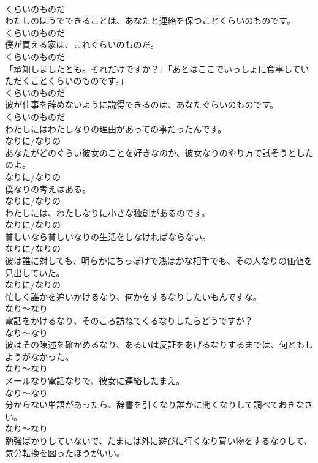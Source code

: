 \documentclass[8pt]{extreport}
\begin{document}
\begin{CJK}{UTF8}{min}
\\	くらいのものだ
\\	わたしのほうでできることは、あなたと連絡を保つことくらいのものです。	
\\	くらいのものだ
\\	僕が買える家は、これぐらいのものだ。	
\\	くらいのものだ
\\	「承知しましたとも。それだけですか？」「あとはここでいっしょに食事していただくことくらいのものです。」	
\\	くらいのものだ
\\	彼が仕事を辞めないように説得できるのは、あなたぐらいのものです。	
\\	くらいのものだ
\\	わたしにはわたしなりの理由があっての事だったんです。	
\\	なりに/なりの
\\	あなたがどのぐらい彼女のことを好きなのか、彼女なりのやり方で試そうとしたのよ。	
\\	なりに/なりの
\\	僕なりの考えはある。	
\\	なりに/なりの
\\	わたしには、わたしなりに小さな独創があるのです。	
\\	なりに/なりの
\\	貧しいなら貧しいなりの生活をしなければならない。	
\\	なりに/なりの
\\	彼は誰に対しても、明らかにちっぽけで浅はかな相手でも、その人なりの価値を見出していた。	
\\	なりに/なりの
\\	忙しく誰かを追いかけるなり、何かをするなりしたいもんですな。	
\\	なり～なり
\\	電話をかけるなり、そのころ訪ねてくるなりしたらどうですか？	
\\	なり～なり
\\	彼はその陳述を確かめるなり、あるいは反証をあげるなりするまでは、何ともしようがなかった。	
\\	なり～なり
\\	メールなり電話なりで、彼女に連絡したまえ。	
\\	なり～なり
\\	分からない単語があったら、辞書を引くなり誰かに聞くなりして調べておきなさい。	
\\	なり～なり
\\	勉強ばかりしていないで、たまには外に遊びに行くなり買い物をするなりして、気分転換を図ったほうがいい。	

\end{CJK}
\end{document}
